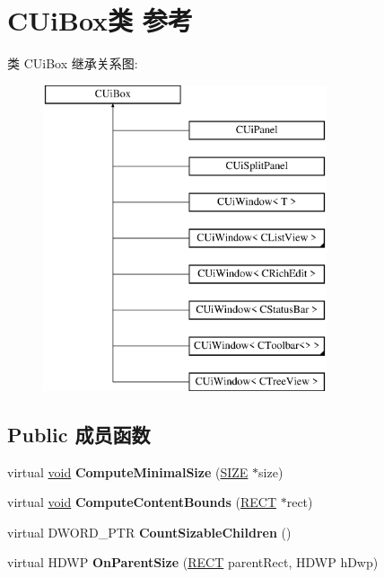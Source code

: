 \hypertarget{class_c_ui_box}{}\section{C\+Ui\+Box类 参考}
\label{class_c_ui_box}
类 C\+Ui\+Box 继承关系图\+:\begin{figure}[H]
\begin{center}
\leavevmode
\includegraphics[height=9.000000cm]{class_c_ui_box}
\end{center}
\end{figure}
\subsection*{Public 成员函数}
\begin{DoxyCompactItemize}
\item 
\mbox{\label{class_c_ui_box_a021c384d1560b8b5b5ec483aede2394b}} 
virtual \hyperlink{interfacevoid}{void} {\bfseries Compute\+Minimal\+Size} (\hyperlink{structtag_s_i_z_e}{S\+I\+ZE} $\ast$size)
\item 
\mbox{\label{class_c_ui_box_a56b99774c9ec7e9348db9630cb854325}} 
virtual \hyperlink{interfacevoid}{void} {\bfseries Compute\+Content\+Bounds} (\hyperlink{structtag_r_e_c_t}{R\+E\+CT} $\ast$rect)
\item 
\mbox{\label{class_c_ui_box_a304e5d6177827e1b1d0a4062d447ac3f}} 
virtual D\+W\+O\+R\+D\+\_\+\+P\+TR {\bfseries Count\+Sizable\+Children} ()
\item 
\mbox{\label{class_c_ui_box_adee4b4df9995c4d728848701cd5c05cd}} 
virtual H\+D\+WP {\bfseries On\+Parent\+Size} (\hyperlink{structtag_r_e_c_t}{R\+E\+CT} parent\+Rect, H\+D\+WP h\+Dwp)
\end{DoxyCompactItemize}
